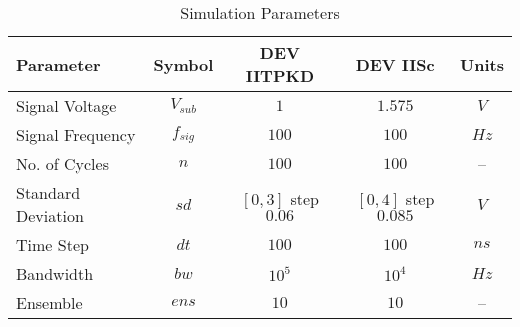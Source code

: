 \documentclass{article}
\begin{document}
\begin{table}[H]
\centering
\begin{tabular}{|l|c|c|c|c|}
\hline
Parameter & Symbol & DEV IITPKD & DEV IISc & Units \\
\hline
Signal Voltage & $V_{sub}$ & $1$ & $1.575$ & $V$ \\
Signal Frequency & $f_{sig}$ & $100$ & $100$ & $Hz$ \\
No. of Cycles & $n$ & $100$ & $100$ & -- \\
Standard Deviation & $sd$ & $[0, 3]$ step $0.06$ & $[0, 4]$ step $0.085$ & $V$ \\
Time Step & $dt$ & $100$ & $100$ & $ns$ \\
Bandwidth & $bw$ & $10^5$ & $10^4$ & $Hz$ \\
Ensemble & $ens$ & $10$ & $10$ & -- \\
\hline
\end{tabular}
\caption{Simulation Parameters}
\end{table}
\end{document}
